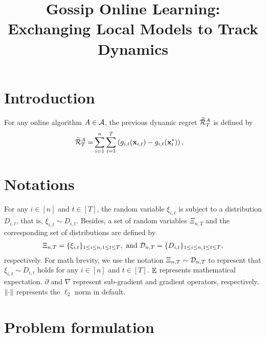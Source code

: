 \documentclass{article}
\title{Gossip Online Learning: Exchanging Local Models to Track Dynamics}
\begin{document}
\maketitle

\begin{abstract}





\end{abstract}


\section{Introduction}
\label{sect_introduction}

For any online algorithm $A \in {\mathcal{A}}$, the previous dynamic regret $\widetilde{{\mathcal{R}}}_T^{A}$ is defined by
\begin{align}
\label{equa_definition_previous_regret}
\widetilde{{\mathcal{R}}}_T^{A} = &  \sum_{i=1}^n\sum_{t=1}^T \left(  g_{i,t}({\bf x}_{i,t}) - g_{i,t}({\bf x}_t^\ast)  \right),
\end{align} 





\section{Notations}
For any $i\in[n]$ and $t\in[T]$, the random variable $\xi_{i,t}$ is subject to a distribution $D_{i,t}$, that is, $\xi_{i,t} \sim D_{i,t}$. Besides, a set of random variables $\Xi_{n,T}$ and the corresponding set of distributions are defined by
\begin{align}
\nonumber
\Xi_{n,T} = \{ \xi_{i,t} \}_{1\le i \le n, 1 \le t \le T}, \text{~and~} \mathcal{D}_{n,T} = \{ D_{i,t} \}_{1\le i \le n, 1 \le t \le T},
\end{align} respectively. For math brevity, we use the notation $\Xi_{n,T} \sim \mathcal{D}_{n,T}$ to represent that $\xi_{i,t} \sim D_{i,t}$ holds for any $i\in[n]$ and $t\in[T]$.  $\mathop{\mathbb{E}}$ represents mathematical expectation. $\partial$ and $\nabla$ represent sub-gradient and gradient operators, respectively. $\left\lVert\cdot\right\rVert$ represents the $\ell_2$ norm in default. 


\section{Problem formulation}
\end{document}
